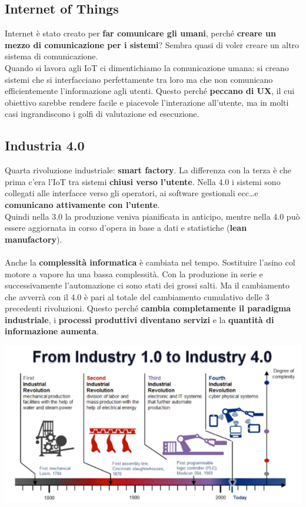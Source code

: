 \documentclass[10pt]{article}
\begin{document}
\subsection{Internet of Things}
Internet è stato creato per \textbf{far comunicare gli umani}, perché \textbf{creare un mezzo di comunicazione per i sistemi}? Sembra quasi di voler creare un altro sistema di comunicazione.\\
Quando si lavora agli IoT ci dimentichiamo la comunicazione umana: si creano sistemi che si interfacciano perfettamente tra loro ma che non comunicano efficientemente l'informazione agli utenti. Questo perché \textbf{peccano di UX}, il cui obiettivo sarebbe rendere facile e piacevole l'interazione all'utente, ma in molti casi ingrandiscono i golfi di valutazione ed esecuzione.
\subsection{Industria 4.0}
Quarta rivoluzione industriale: \textbf{smart factory}. La differenza con la terza è che prima c'era l'IoT tra sistemi \textbf{chiusi verso l'utente}. Nella 4.0 i sistemi sono collegati alle interfacce verso gli operatori, ai software gestionali ecc\ldots e \textbf{comunicano attivamente con l'utente}.\\
Quindi nella 3.0 la produzione veniva pianificata in anticipo, mentre nella 4.0 può essere aggiornata in corso d'opera in base a dati e statistiche (\textbf{lean manufactory}).\\\\
Anche la \textbf{complessità informatica} è cambiata nel tempo. Sostituire l'asino col motore a vapore ha una bassa complessità. Con la produzione in serie e successivamente l'automazione ci sono stati dei grossi salti. Ma il cambiamento che avverrà con il 4.0 è pari al totale del cambiamento cumulativo delle 3 precedenti rivoluzioni. Questo perché \textbf{cambia completamente il paradigma industriale}, i \textbf{processi produttivi diventano servizi} e la \textbf{quantità di informazione aumenta}.
\begin{center}
\includegraphics[scale=0.7]{rivind.png}
\end{center}
\pagebreak
\end{document}
